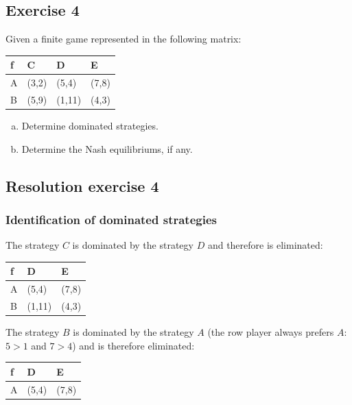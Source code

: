 \documentclass[\main/main.tex]{subfiles}
\begin{document}
\subsection{Exercise 4}
Given a finite game represented in the following matrix:

\begin{table}
  \begin{tabular}{L|LLL}
    f & C     & D      & E     \\
    \hline
    A & (3,2) & (5,4)  & (7,8) \\
    B & (5,9) & (1,11) & (4,3)
  \end{tabular}
\end{table}

\begin{enumerate}[a)]
  \item Determine dominated strategies.
  \item Determine the Nash equilibriums, if any.
\end{enumerate}

\subsection{Resolution exercise 4}
\subsubsection*{Identification of dominated strategies}

The strategy $C$ is dominated by the strategy $D$ and therefore is eliminated:

\begin{table}
  \begin{tabular}{L|LL}
    f & D      & E     \\
    \hline
    A & (5,4)  & (7,8) \\
    B & (1,11) & (4,3)
  \end{tabular}
\end{table}

The strategy $B$ is dominated by the strategy $A$ (the row player always prefers $A$: $5>1$ and $7>4$) and is therefore eliminated:

\begin{table}
  \begin{tabular}{L|LL}
    f & D     & E     \\
    \hline
    A & (5,4) & (7,8) \\
  \end{tabular}
\end{table}
\end{document}

